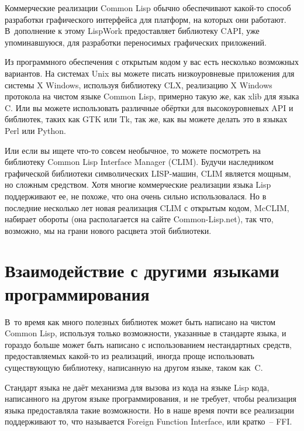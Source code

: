 Коммерческие реализации Common Lisp обычно обеспечивают какой-то способ разработки
графического интерфейса для платформ, на которых они работают. В~дополнение к этому
LispWork предоставляет библиотеку CAPI, уже упоминавшуюся, для разработки переносимых
графических приложений.

Из программного обеспечения с открытым кодом у вас есть несколько возможных вариантов. На
системах Unix вы можете писать низкоуровневые приложения для системы X Windows, используя
библиотеку CLX, реализацию X Windows протокола на чистом языке Common Lisp, примерно такую
же, как xlib для языка C. Или вы можете использовать различные обёртки для высокоуровневых
API и библиотек, таких как GTK или Tk, так же, как вы можете делать это в языках Perl или
Python.

Или если вы ищете что-то совсем необычное, то можете посмотреть на библиотеку Common
Lisp Interface Manager (CLIM). Будучи наследником графической библиотеки символических
LISP-машин, CLIM является мощным, но сложным средством. Хотя многие коммерческие
реализации языка Lisp поддерживают ее, не похоже, что она очень сильно использовалася. Но в
последние несколько лет новая реализация CLIM с открытым кодом, McCLIM, набирает обороты
(она располагается на сайте Common-Lisp.net), так что, возможно, мы на грани нового расцвета
этой библиотеки.

\section{Взаимодействие с другими языками программирования}

В~то время как много полезных библиотек может быть написано на чистом Common Lisp,
используя только возможности, указанные в стандарте языка, и гораздо больше может быть
написано с использованием нестандартных средств, предоставляемых какой-то из реализаций,
иногда проще использовать существующую библиотеку, написанную на другом языке, таком
как~C.

Стандарт языка не даёт механизма для вызова из кода на языке Lisp кода, написанного на
другом языке программирования, и не требует, чтобы реализация языка предоставляла такие
возможности. Но в наше время почти все реализации поддерживают то, что называется Foreign
Function Interface, или кратко~-- FFI.

